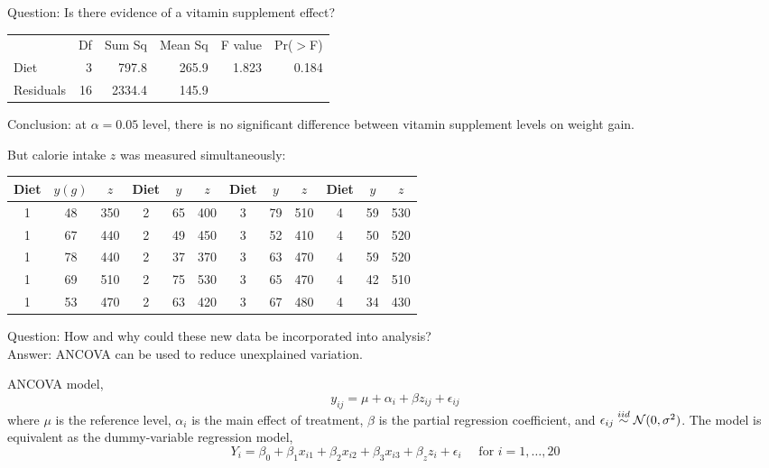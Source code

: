 Question: Is there evidence of a vitamin supplement effect?

\begin{table}[H]
	\renewcommand{\arraystretch}{1.5}
	\centering
	\begin{tabular}{lrrrrr}
		& Df & Sum Sq & Mean Sq & F value & Pr($>$F)\\
	Diet & 3 & 	797.8  & 265.9 &  1.823 & 0.184\\
	Residuals  & 16& 2334.4 &  145.9 & &\\              	
	\end{tabular}
\end{table}
\begin{pf}
Conclusion: at $\alpha = 0.05$ level, there is no significant difference between vitamin supplement levels on weight gain.
\end{pf}

But calorie intake $z$ was measured simultaneously:
\begin{table}[H]
	\renewcommand{\arraystretch}{1.5}
	\centering
	\begin{tabular}{ccc|ccc|ccc|ccc}
		\toprule
		Diet & $y(g)$ & $z$ & Diet & $y$ & $z$& Diet & $y$ & $z$& Diet & $y$ & $z$\\
		\hline
		1 & 48 & 350 & 2 & 65 & 400 & 3 & 79 & 510 & 4 & 59 & 530\\
		1 & 67 & 440 & 2 & 49 & 450 & 3 & 52 & 410 & 4 & 50 & 520\\
		1 & 78 & 440 & 2 & 37 & 370 & 3 & 63 & 470 & 4 & 59 & 520\\
		1 & 69 & 510 & 2 & 75 & 530 & 3 & 65 & 470 & 4 & 42 & 510\\
		1 & 53 & 470 & 2 & 63 & 420 & 3 & 67 & 480 & 4 & 34 & 430\\						
		\bottomrule
	\end{tabular}
\end{table}

Question: How and why could these new data be incorporated into analysis?\\
Answer: ANCOVA can be used to reduce unexplained variation.

ANCOVA model, 
$$
y_{ij} = \mu + \alpha_i + \beta z_{ij} + \epsilon_{ij}
$$
where $\mu$ is the reference level, $\alpha_i$ is the main effect of treatment, $\beta$ is the partial regression coefficient, 
and $\epsilon_{ij} \overset{iid}{\sim} \mathcal{N}(0, \sigma^2)$.
The model is equivalent as the dummy-variable regression model,
$$
Y_i = \beta_0 + \beta_1 x_{i1} + \beta_2 x_{i2} + \beta_3 x_{i3} + \beta_z z_i + \epsilon_i \quad \mbox{ for } i = 1, \dots, 20
$$

